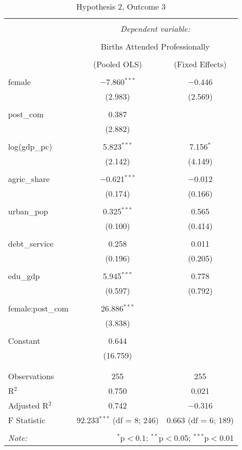 \documentclass[12pt]{article}
\begin{document}
\begin{table}[!htbp] \centering 
  \caption{Hypothesis 2, Outcome 3} 
  \label{} 
\begin{tabular}{@{\extracolsep{5pt}}lcc} 
\\[-1.8ex]\hline 
\hline \\[-1.8ex] 
 & \multicolumn{2}{c}{\textit{Dependent variable:}} \\ 
\cline{2-3} 
\\[-1.8ex] & \multicolumn{2}{c}{Births Attended Professionally} \\ 
\\[-1.8ex] & (Pooled OLS) & (Fixed Effects)\\ 
\hline \\[-1.8ex] 
 female & $-$7.860$^{***}$ & $-$0.446 \\ 
  & (2.983) & (2.569) \\ 
  & & \\ 
 post\_com & 0.387 &  \\ 
  & (2.882) &  \\ 
  & & \\ 
 log(gdp\_pc) & 5.823$^{***}$ & 7.156$^{*}$ \\ 
  & (2.142) & (4.149) \\ 
  & & \\ 
 agric\_share & $-$0.621$^{***}$ & $-$0.012 \\ 
  & (0.174) & (0.166) \\ 
  & & \\ 
 urban\_pop & 0.325$^{***}$ & 0.565 \\ 
  & (0.100) & (0.414) \\ 
  & & \\ 
 debt\_service & 0.258 & 0.011 \\ 
  & (0.196) & (0.205) \\ 
  & & \\ 
 edu\_gdp & 5.945$^{***}$ & 0.778 \\ 
  & (0.597) & (0.792) \\ 
  & & \\ 
 female:post\_com & 26.886$^{***}$ &  \\ 
  & (3.838) &  \\ 
  & & \\ 
 Constant & 0.644 &  \\ 
  & (16.759) &  \\ 
  & & \\ 
\hline \\[-1.8ex] 
Observations & 255 & 255 \\ 
R$^{2}$ & 0.750 & 0.021 \\ 
Adjusted R$^{2}$ & 0.742 & $-$0.316 \\ 
F Statistic & 92.233$^{***}$ (df = 8; 246) & 0.663 (df = 6; 189) \\ 
\hline 
\hline \\[-1.8ex] 
\textit{Note:}  & \multicolumn{2}{r}{$^{*}$p$<$0.1; $^{**}$p$<$0.05; $^{***}$p$<$0.01} \\ 
\end{tabular} 
\end{table} 
\end{document}
